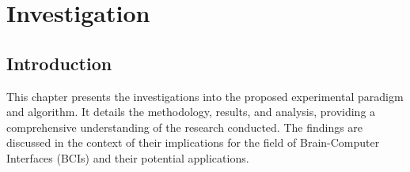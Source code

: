 \chapter{Investigation}
\label{chapter4}

\section{Introduction}
\label{ch4:introduction}

\begin{paragraph}
This chapter presents the investigations into the proposed experimental paradigm and algorithm. It details the methodology, results, and analysis, providing a comprehensive understanding of the research conducted. The findings are discussed in the context of their implications for the field of Brain-Computer Interfaces (BCIs) and their potential applications.
\end{paragraph}